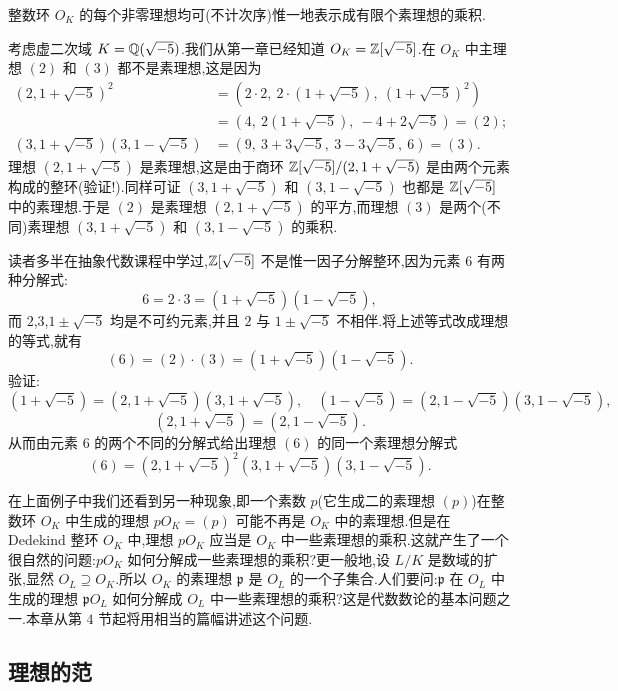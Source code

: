 \begin{corollarynonum}
整数环 $O_K$ 的每个非零理想均可(不计次序)惟一地表示成有限个素理想的乘积.
\end{corollarynonum}

\begin{example}\label{ex:ch2-s1-2-1}
考虑虚二次域 $K=\mathbb{Q}(\sqrt{-5})$.我们从第一章已经知道 $O_K=\mathbb{Z}[\sqrt{-5}]$.在 $O_K$ 中主理想 $(2)$ 和 $(3)$ 都不是素理想,这是因为
\begin{align*}
  (2,1+\sqrt{-5})^2&=(2\cdot 2,\ 2\cdot(1+\sqrt{-5}),\ (1+\sqrt{-5})^2)\\
  &=(4,\ 2(1+\sqrt{-5}),\ -4+2\sqrt{-5})=(2);\\
  (3,1+\sqrt{-5})(3,1-\sqrt{-5})&=(9,\ 3+3\sqrt{-5},\ 3-3\sqrt{-5},\ 6)=(3).
\end{align*}
理想 $(2,1+\sqrt{-5})$ 是素理想,这是由于商环 $\mathbb{Z}[\sqrt{-5}]/(2,1+\sqrt{-5})$ 是由两个元素构成的整环(验证!).同样可证 $(3,1+\sqrt{-5})$ 和 $(3,1-\sqrt{-5})$ 也都是 $\mathbb{Z}[\sqrt{-5}]$ 中的素理想.于是 $(2)$ 是素理想 $(2,1+\sqrt{-5})$ 的平方,而理想 $(3)$ 是两个(不同)素理想 $(3,1+\sqrt{-5})$ 和 $(3,1-\sqrt{-5})$ 的乘积.
\end{example}

读者多半在抽象代数课程中学过,$\mathbb{Z}[\sqrt{-5}]$ 不是惟一因子分解整环,因为元素 $6$ 有两种分解式:
\[
  6=2\cdot 3=(1+\sqrt{-5})(1-\sqrt{-5}),
\]
而 $2$,$3$,$1\pm\sqrt{-5}$ 均是不可约元素,并且 $2$ 与 $1\pm\sqrt{-5}$ 不相伴.将上述等式改成理想的等式,就有
\[
  (6)=(2)\cdot(3)=(1+\sqrt{-5})(1-\sqrt{-5}).
\]
验证:
\[
  (1+\sqrt{-5})=(2,1+\sqrt{-5})(3,1+\sqrt{-5}),\quad
  (1-\sqrt{-5})=(2,1-\sqrt{-5})(3,1-\sqrt{-5}),
\]
\[
  (2,1+\sqrt{-5})=(2,1-\sqrt{-5}).
\]
从而由元素 $6$ 的两个不同的分解式给出理想 $(6)$ 的同一个素理想分解式
\[
  (6)=(2,1+\sqrt{-5})^2(3,1+\sqrt{-5})(3,1-\sqrt{-5}).
\]

在上面例子中我们还看到另一种现象,即一个素数 $p$(它生成二的素理想 $(p)$)在整数环 $O_K$ 中生成的理想 $pO_K=(p)$ 可能不再是 $O_K$ 中的素理想.但是在 Dedekind 整环 $O_K$ 中,理想 $pO_K$ 应当是 $O_K$ 中一些素理想的乘积.这就产生了一个很自然的问题:$pO_K$ 如何分解成一些素理想的乘积?更一般地,设 $L/K$ 是数域的扩张,显然 $O_L\supseteq O_K$.所以 $O_K$ 的素理想 $\mathfrak{p}$ 是 $O_L$ 的一个子集合.人们要问:$\mathfrak{p}$ 在 $O_L$ 中生成的理想 $\mathfrak{p}O_L$ 如何分解成 $O_L$ 中一些素理想的乘积?这是代数数论的基本问题之一.本章从第 $4$ 节起将用相当的篇幅讲述这个问题.

\subsection{理想的范}\label{sec:ch2-s1-3}

